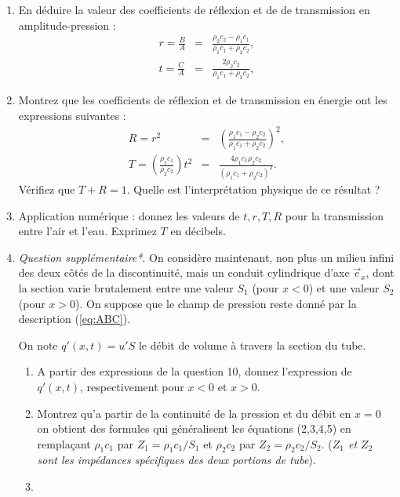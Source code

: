 \documentclass[10pt, a4paper]{article}
\begin{document}
\begin{enumerate}
\item 
En déduire la valeur des coefficients de réflexion et de de transmission en amplitude-pression :
\begin{eqnarray}
r = \frac{B}{A} &=& \frac{\rho_2 c_2 - \rho_1 c_1}{\rho_1 c_1 + \rho_2 c_2},\\
t = \frac{C}{A} &=& \frac{2 \rho_2 c_2}{\rho_1 c_1 + \rho_2 c_2},
\label{eq:rt}
\end{eqnarray}


\item Montrez que les coefficients de réflexion et de transmission en énergie ont les expressions suivantes :
\begin{eqnarray}
R = r^2 &=& \left(\frac{\rho_1 c_1 - \rho_2 c_2}{\rho_1 c_1 + \rho_2 c_2}\right)^2,\\
T = \left( \frac{\rho_1 c_1}{\rho_2 c_2} \right) t^2 &=& \frac{4 \rho_1 c_1\rho_2 c_2}{(\rho_1 c_1 + \rho_2 c_2)^2}.
\label{eq:RT}
\end{eqnarray}
Vérifiez que $T+R = 1$. Quelle est l'interprétation physique de ce résultat ?

\item Application numérique : donnez les valeurs de $t,r,T,R$ pour la transmission entre l'air et l'eau.
Exprimez $T$ en décibels.

\item {\em Question supplémentaire*}.
On considère maintenant, non plus un milieu infini des deux côtés de la discontinuité, mais un conduit cylindrique d'axe $\vec{e}_x$, dont la section varie brutalement entre une valeur $S_1$ (pour $x<0$) et une valeur $S_2$ (pour $x>0$). On suppose que le champ de pression reste donné par la description (\ref{eq:ABC}).

On note $q'(x,t)  = u' S$ le débit de volume à travers la section du tube.

\begin{enumerate}

\item A partir des expressions de la question 10, donnez  l'expression de $q'(x,t)$, respectivement  pour $x<0$ et $x>0$.

\item
Montrez qu'a partir de la continuité de la pression et du débit en $x=0$ on obtient des formules qui généralisent les équations (2,3,4,5) %
en remplaçant $\rho_1 c_1$ par $Z_1 = \rho_1 c_1/S_1$ et  $\rho_2 c_2$ par $Z_2 = \rho_2 c_2/S_2$. ({\em $Z_1$ et $Z_2$ sont les impédances spécifiques des deux portions de tube}).
\item


\end{enumerate}
\end{enumerate}
\end{document}
